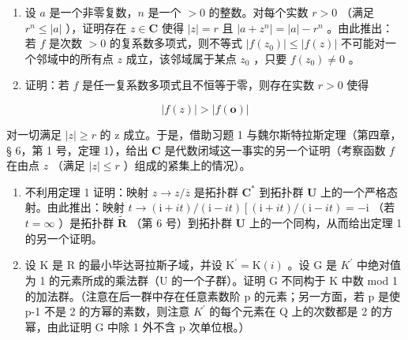 \ExerciseSection

\begin{enumerate}
\def\labelenumi{\arabic{enumi})}
\item
  设 \(a\) 是一个非零复数，\(n\) 是一个 \(>0\) 的整数。对每个实数 \(r > 0\) （满足 \(r^n \leqslant |a|\) ），证明存在 \(z \in \mathbf{C}\) 使得 \(|z| = r\) 且 \(|a + z^n| = |a| - r^n\) 。由此推出：若 \(f\) 是次数 \(>0\) 的复系数多项式，则不等式 \(|f(z_0)| \leqslant |f(z)|\) 不可能对一个邻域中的所有点 \(z\) 成立，该邻域属于某点 \(z_0\) ，只要 \(f(z_0) \neq 0\) 。
\item
  证明：若 \(f\) 是任一复系数多项式且不恒等于零，则存在实数 \(r > 0\) 使得
\end{enumerate}

\[
\left| f (z) \right| > \left| f (\mathbf {o}) \right|
\]

对一切满足 \(|z| \geqslant r\) 的 z 成立。于是，借助习题 1 与魏尔斯特拉斯定理（第四章，§ 6，第 1 号，定理 1），给出 \(\mathbf{C}\) 是代数闭域这一事实的另一个证明（考察函数 \(f\) 在由点 \(z\) （满足 \(|z| \leqslant r\) ）组成的紧集上的情况）。

\begin{enumerate}
\def\labelenumi{\arabic{enumi})}
\setcounter{enumi}{2}
\item
  不利用定理 1 证明：映射 \(z \to z / \overline{z}\) 是拓扑群 \(\mathbf{C}^*\) 到拓扑群 \(\mathbf{U}\) 上的一个严格态射。由此推出：映射 \(t \to (\mathrm{i} + it) / (\mathrm{i} - it) \left[ (\mathrm{i} + it) / (\mathrm{i} - it) = -\mathrm{i} \right.\) （若 \(t = \infty\) ）是拓扑群 \(\tilde{\mathbf{R}}\) （第 6 号）到拓扑群 \(\mathbf{U}\) 上的一个同构，从而给出定理 1 的另一个证明。
\item
  设 K 是 R 的最小毕达哥拉斯子域，并设 \(\mathrm{K}^{\prime}=\mathrm{K}(i)\) 。设 G 是 \(K^{\prime}\) 中绝对值为 1 的元素所成的乘法群（U 的一个子群）。证明 G 不同构于 K 中数 mod 1 的加法群。（注意在后一群中存在任意素数阶 p 的元素；另一方面，若 p 是使 p-1 不是 2 的方幂的素数，则注意 \(K^{\prime}\) 的每个元素在 Q 上的次数都是 2 的方幂，由此证明 G 中除 1 外不含 p 次单位根。）
\end{enumerate}

